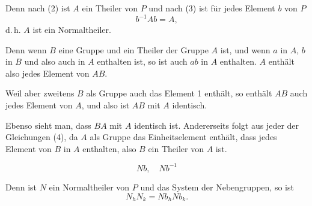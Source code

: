 




Denn nach (2) ist $A$ ein Theiler von $P$ und nach (3) ist für jedes Element $b$ von $P$
\[
b^{-1}Ab = A,
\]
d.\,h. $A$ ist ein Normaltheiler.




Denn wenn $B$ eine Gruppe und ein Theiler der Gruppe $A$ ist, und wenn $a$ in $A$, $b$ in $B$ und also auch in $A$ enthalten ist, so ist auch $ab$ in $A$ enthalten. $A$ enthält also jedes Element von $AB$.

Weil aber zweitens $B$ als Gruppe auch das Element 1 enthält, so enthält $AB$ auch jedes Element von $A$, und also ist $AB$ mit $A$ identisch.

Ebenso sieht man, dass $BA$ mit $A$ identisch ist. Andererseits folgt aus jeder der Gleichungen (4), da $A$ als Gruppe das Einheitselement enthält, dass jedes Element von $B$ in $A$ enthalten, also $B$ ein Theiler von $A$ ist.

\[
Nb, \quad Nb^{-1}
\]

Denn ist $N$ ein Normaltheiler von $P$ und
das System der Nebengruppen, so ist
\[
N_h N_k = N b_h N b_k.
\]
